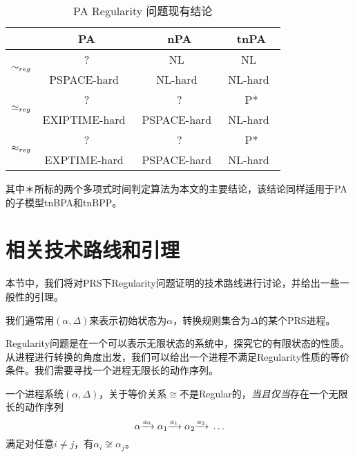\begin{table}[htbp]
\begin{center}
\begin{tabular}{|c|c|c|c|}
\hline
	&PA	&nPA	&tnPA\\
\hline
\hline
\multirow{2}{*}{$\sim_{reg}$} &
 ? &NL~\cite{Kucera1996} &NL~\cite{Kucera1996} \\
& PSPACE-hard~\cite{Srba2002a} & NL-hard~\cite{Srba2002a} & NL-hard~\cite{Srba2002a}\\
\hline
\multirow{2}{*}{$\simeq_{reg}$} &
 ? & ? &P* \\
& EXIPTIME-hard~\cite{Mayr2003} & PSPACE-hard~\cite{Srba2003} & NL-hard~\cite{Srba2002a}\\
\hline
\multirow{2}{*}{$\approx_{reg}$} &
 ? & ? &P* \\
& EXPTIME-hard~\cite{Mayr2003} & PSPACE-hard~\cite{Srba2003} & NL-hard~\cite{Srba2002a}\\
\hline
\end{tabular}
\caption{\textsf{PA} Regularity 问题现有结论}
\label{tab:pa-reg}
\end{center}
\end{table}

其中＊所标的两个多项式时间判定算法为本文的主要结论，该结论同样适用于PA的子模型tnBPA和tnBPP。

\section{相关技术路线和引理}
\label{sec:lemma}

本节中，我们将对PRS下Regularity问题证明的技术路线进行讨论，并给出一些一般性的引理。

我们通常用$(\alpha,\Delta)$来表示初始状态为$\alpha$，转换规则集合为$\Delta$的某个PRS进程。

Regularity问题是在一个可以表示无限状态的系统中，探究它的有限状态的性质。从进程进行转换的角度出发，我们可以给出一个进程不满足Regularity性质的等价条件。我们需要寻找一个进程无限长的动作序列。

\begin{lem}\label{lemma:infi-path}
一个进程系统$(\alpha,\Delta)$，关于等价关系$\cong$不是Regular的，\emph{当且仅当}存在一个无限长的动作序列
$$\alpha{\xrightarrow{a_0}{}}\alpha_1{\xrightarrow{a_1}{}}\alpha_2{\xrightarrow{a_2}{}}\ldots$$ 
满足对任意$i\neq j$，有$\alpha_i\not\cong\alpha_j$。
\end{lem}

